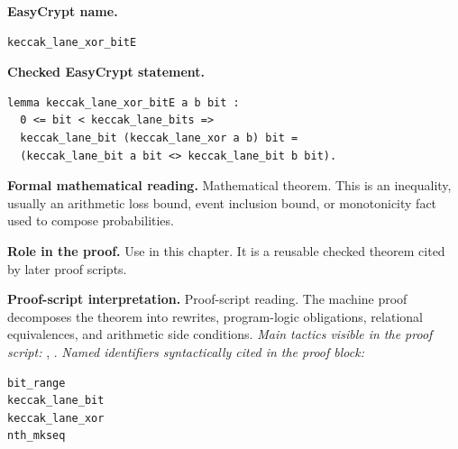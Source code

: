 \begin{formaltheorem}
\noindent\textbf{EasyCrypt name.}
\begin{lstlisting}[language=EasyCrypt,basicstyle=\ttfamily\scriptsize]
keccak_lane_xor_bitE
\end{lstlisting}
\noindent\textbf{Checked EasyCrypt statement.}
\begin{lstlisting}[language=EasyCrypt,basicstyle=\ttfamily\scriptsize]
lemma keccak_lane_xor_bitE a b bit :
  0 <= bit < keccak_lane_bits =>
  keccak_lane_bit (keccak_lane_xor a b) bit =
  (keccak_lane_bit a bit <> keccak_lane_bit b bit).
\end{lstlisting}
\noindent\textbf{Formal mathematical reading.}
Mathematical theorem. This is an inequality, usually an arithmetic loss bound, event inclusion bound, or monotonicity fact used to compose probabilities.

\noindent\textbf{Role in the proof.}
Use in this chapter. It is a reusable checked theorem cited by later proof scripts.

\noindent\textbf{Proof-script interpretation.}
Proof-script reading. The machine proof decomposes the theorem into rewrites, program-logic obligations, relational equivalences, and arithmetic side conditions.
\emph{Main tactics visible in the proof script:} , .
\emph{Named identifiers syntactically cited in the proof block:}
\begin{lstlisting}[language=EasyCrypt,basicstyle=\ttfamily\scriptsize]
bit_range
keccak_lane_bit
keccak_lane_xor
nth_mkseq
\end{lstlisting}

\end{formaltheorem}

